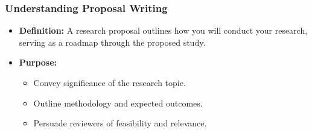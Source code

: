\documentclass[aspectratio=169]{beamer}
\begin{document}
\begin{frame}[fragile]
    \frametitle{Understanding Proposal Writing}
    \begin{itemize}
        \item \textbf{Definition:} A research proposal outlines how you will conduct your research, serving as a roadmap through the proposed study.
        \item \textbf{Purpose:}
        \begin{itemize}
            \item Convey significance of the research topic.
            \item Outline methodology and expected outcomes.
            \item Persuade reviewers of feasibility and relevance.
        \end{itemize}
    \end{itemize}
\end{frame}
\end{document}
